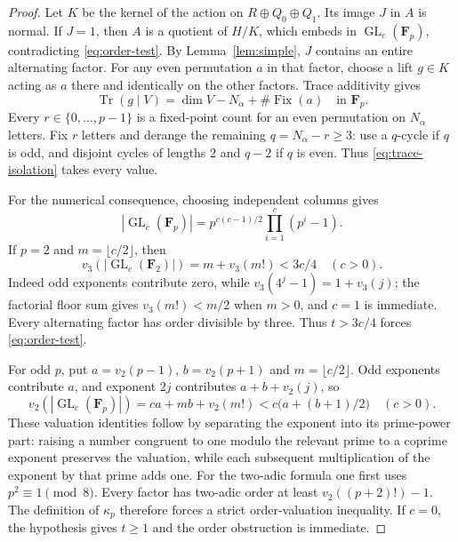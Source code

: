 \documentclass[11pt]{article}
\theoremstyle{remark}\newtheorem{remark}[theorem]{Remark}
\newcommand{\FF}{\mathbf F}
\newcommand{\GL}{\operatorname{GL}}
\newcommand{\Tr}{\operatorname{Tr}}
\begin{document}
\begin{proof}
Let $K$ be the kernel of the action on $R\oplus Q_0\oplus Q_1$. Its image $J$ in $A$ is normal. If $J=1$, then $A$ is a quotient of $H/K$, which embeds in $\GL_c(\FF_p)$, contradicting \eqref{eq:order-test}. By Lemma~\ref{lem:simple}, $J$ contains an entire alternating factor. For any even permutation $a$ in that factor, choose a lift $g\in K$ acting as $a$ there and identically on the other factors. Trace additivity gives
\begin{equation}\label{eq:trace-isolation}
             \Tr(g\mid V)=\dim V-N_\alpha+\#\operatorname{Fix}(a)
                         \quad\text{in }\FF_p.
\end{equation}
Every $r\in\{0,\ldots,p-1\}$ is a fixed-point count for an even permutation on $N_\alpha$ letters. Fix $r$ letters and derange the remaining $q=N_\alpha-r\ge3$: use a $q$-cycle if $q$ is odd, and disjoint cycles of lengths $2$ and $q-2$ if $q$ is even. Thus \eqref{eq:trace-isolation} takes every value.

For the numerical consequence, choosing independent columns gives
\[
 |\GL_c(\FF_p)|=p^{c(c-1)/2}\prod_{i=1}^c(p^i-1).
\]
If $p=2$ and $m=\lfloor c/2\rfloor$, then
\begin{equation}\label{eq:valuation-two}
 v_3(|\GL_c(\FF_2)|)=m+v_3(m!)<3c/4\quad(c>0).
\end{equation}
Indeed odd exponents contribute zero, while
$v_3(4^j-1)=1+v_3(j)$; the factorial floor sum gives $v_3(m!)<m/2$ when $m>0$, and $c=1$ is immediate. Every alternating factor has order divisible by three. Thus $t>3c/4$ forces \eqref{eq:order-test}.

For odd $p$, put $a=v_2(p-1)$, $b=v_2(p+1)$ and $m=\lfloor c/2\rfloor$. Odd exponents contribute $a$, and exponent $2j$ contributes $a+b+v_2(j)$, so
\begin{equation}\label{eq:valuation-odd}
 v_2(|\GL_c(\FF_p)|)=ca+mb+v_2(m!)
                    <c\bigl(a+(b+1)/2\bigr)\quad(c>0).
\end{equation}
These valuation identities follow by separating the exponent into its prime-power part: raising a number congruent to one modulo the relevant prime to a coprime exponent preserves the valuation, while each subsequent multiplication of the exponent by that prime adds one. For the two-adic formula one first uses $p^2\equiv1\pmod8$.
Every factor has two-adic order at least $v_2((p+2)!)-1$. The definition of $\kappa_p$ therefore forces a strict order-valuation inequality. If $c=0$, the hypothesis gives $t\ge1$ and the order obstruction is immediate.
\end{proof}
\end{document}
